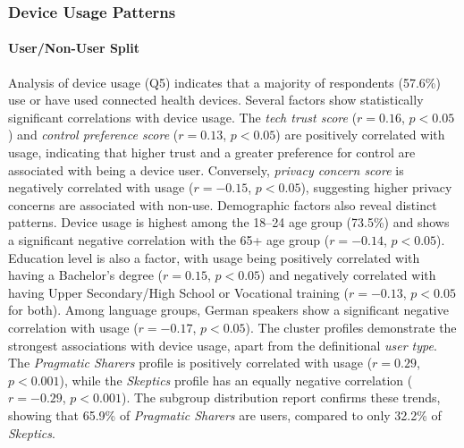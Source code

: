 	\subsubsection{Device Usage Patterns}

	\paragraph{User/Non-User Split}
	Analysis of device usage (Q5) indicates that a majority of respondents (57.6\%) use or have used connected health devices.
	Several factors show statistically significant correlations with device usage. The \textit{tech trust score} ($r = 0.16$, $p < 0.05$) and \textit{control preference score} ($r = 0.13$, $p < 0.05$) are positively correlated with usage, indicating that higher trust and a greater preference for control are associated with being a device user. Conversely, \textit{privacy concern score} is negatively correlated with usage ($r = -0.15$, $p < 0.05$), suggesting higher privacy concerns are associated with non-use.
	Demographic factors also reveal distinct patterns. Device usage is highest among the 18--24 age group (73.5\%) and shows a significant negative correlation with the 65+ age group ($r = -0.14$, $p < 0.05$). Education level is also a factor, with usage being positively correlated with having a Bachelor's degree ($r = 0.15$, $p < 0.05$) and negatively correlated with having Upper Secondary/High School or Vocational training ($r = -0.13$, $p < 0.05$ for both). Among language groups, German speakers show a significant negative correlation with usage ($r = -0.17$, $p < 0.05$).
	The cluster profiles demonstrate the strongest associations with device usage, apart from the definitional \textit{user type}. The \textit{Pragmatic Sharers} profile is positively correlated with usage ($r = 0.29$, $p < 0.001$), while the \textit{Skeptics} profile has an equally negative correlation ($r = -0.29$, $p < 0.001$). The subgroup distribution report confirms these trends, showing that 65.9\% of \textit{Pragmatic Sharers} are users, compared to only 32.2\% of \textit{Skeptics}.

